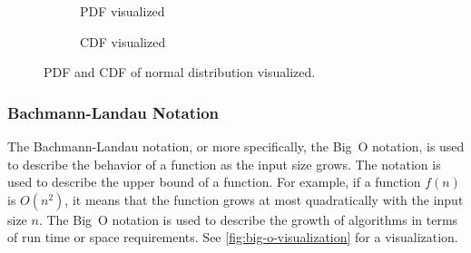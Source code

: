 \begin{figure}[H]
  \begin{subfigure}[b]{0.4\textwidth}
    \centering
    \caption{\gls{PDF} visualized}
    \label{fig:pdf-theory}
  \end{subfigure}
  \hfill
  \begin{subfigure}[b]{0.4\textwidth}
    \centering
    \caption{\gls{CDF} visualized}
    \label{fig:cdf-theory}
  \end{subfigure}
  \caption{\gls{PDF} and \gls{CDF} of normal distribution visualized.}
  \label{fig:probability-theory}
\end{figure}

\subsubsection{Bachmann-Landau Notation}

The Bachmann-Landau notation, or more specifically, the Big~O notation, is used to describe the behavior of a function as the input size grows. The notation is used to describe the upper bound of a function. For example, if a function $f(n)$ is $O(n^2)$, it means that the function grows at most quadratically with the input size $n$. The Big~O notation is used to describe the growth of algorithms in terms of run time or space requirements. See \autoref{fig:big-o-visualization} for a visualization.

